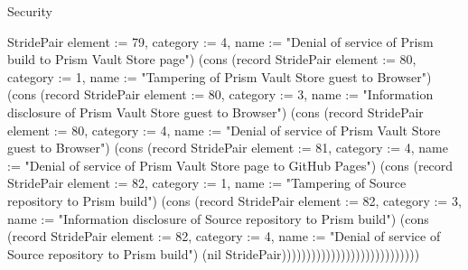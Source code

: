 \begin{lexlean}{Security}
\begin{semanticmodule}
{StridePair {element := 79, category := 4, name := "Denial of service of Prism build to Prism Vault Store page"}) (cons (record StridePair {element := 80, category := 1, name := "Tampering of Prism Vault Store guest to Browser"}) (cons (record StridePair {element := 80, category := 3, name := "Information disclosure of Prism Vault Store guest to Browser"}) (cons (record StridePair {element := 80, category := 4, name := "Denial of service of Prism Vault Store guest to Browser"}) (cons (record StridePair {element := 81, category := 4, name := "Denial of service of Prism Vault Store page to GitHub Pages"}) (cons (record StridePair {element := 82, category := 1, name := "Tampering of Source repository to Prism build"}) (cons (record StridePair {element := 82, category := 3, name := "Information disclosure of Source repository to Prism build"}) (cons (record StridePair {element := 82, category := 4, name := "Denial of service of Source repository to Prism build"}) (nil StridePair))))))))))))))))))))))))))))
}


\end{semanticmodule}
\end{lexlean}
